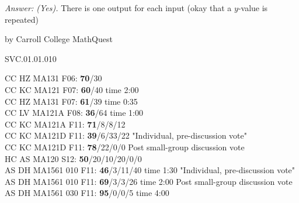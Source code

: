 {\it Answer: (Yes).} There is one output for each input (okay that a $y$-value is repeated)

\medskip


by Carroll College MathQuest

SVC.01.01.010


CC HZ MA131 F06: {\bf 70}/30 \\
CC KC MA121 F07: {\bf 60}/40 time 2:00\\
CC HZ MA131 F07: {\bf 61}/39 time 0:35 \\
CC LV MA121A F08: {\bf 36}/64 time 1:00 \\
CC KC MA121A F11: {\bf 71}/8/8/12  \\
CC KC MA121D F11: {\bf 39}/6/33/22 "Individual, pre-discussion vote" \\
CC KC MA121D F11: {\bf 78}/22/0/0 Post small-group discussion vote \\
HC AS MA120 S12: {\bf 50}/20/10/20/0/0  \\
AS DH MA1561 010 F11: {\bf 46}/3/11/40 time 1:30 "Individual, pre-discussion vote" \\
AS DH MA1561 010 F11: {\bf 69}/3/3/26 time 2:00 Post small-group discussion vote \\
AS DH MA1561 030 F11: {\bf 95}/0/0/5 time 4:00  \\
